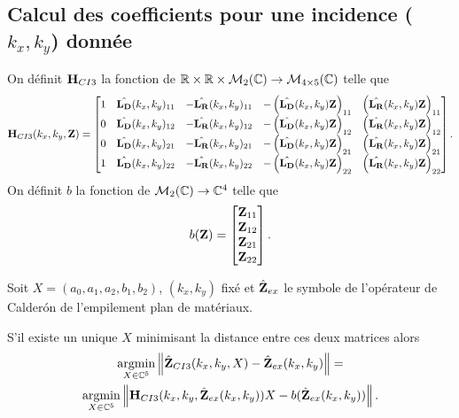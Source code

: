  \subsection{Calcul des coefficients pour une incidence (\(k_x,k_y\)) donnée}
    \begin{defn}
      On définit \(\mathbf{H}_{CI3}\) la fonction de \(\mathbb R \times \mathbb R \times \mathcal{M}_2(\mathbb C) \rightarrow \mathcal{M}_{4\times5}(\mathbb C)\) telle que
      \begin{equation*}
        \mathbf{H}_{CI3}(k_x,k_y,\mathbf{Z}) = \begin{bmatrix}
        1 & \hat{\mathbf{L_D}}(k_x,k_y)_{11} & -\hat{\mathbf{L_R}}(k_x,k_y)_{11} & -\left(\hat{\mathbf{L_D}}(k_x,k_y)\mathbf{Z}\right)_{11} & \left(\hat{\mathbf{L_R}}(k_x,k_y)\mathbf{Z}\right)_{11}
        \\
        0 & \hat{\mathbf{L_D}}(k_x,k_y)_{12} & -\hat{\mathbf{L_R}}(k_x,k_y)_{12} & -\left(\hat{\mathbf{L_D}}(k_x,k_y)\mathbf{Z}\right)_{12} & \left(\hat{\mathbf{L_R}}(k_x,k_y)\mathbf{Z}\right)_{12}
        \\
        0 & \hat{\mathbf{L_D}}(k_x,k_y)_{21} & -\hat{\mathbf{L_R}}(k_x,k_y)_{21} & -\left(\hat{\mathbf{L_D}}(k_x,k_y)\mathbf{Z}\right)_{21} & \left(\hat{\mathbf{L_R}}(k_x,k_y)\mathbf{Z}\right)_{21}
        \\
        1 & \hat{\mathbf{L_D}}(k_x,k_y)_{22} & -\hat{\mathbf{L_R}}(k_x,k_y)_{22} & -\left(\hat{\mathbf{L_D}}(k_x,k_y)\mathbf{Z}\right)_{22} & \left(\hat{\mathbf{L_R}}(k_x,k_y)\mathbf{Z}\right)_{22}
        \end{bmatrix}.
      \end{equation*}
      On définit \(b\) la fonction de \(\mathcal{M}_2(\mathbb C) \rightarrow \mathbb C^4\) telle que
      \begin{equation*}
        b(\mathbf{Z}) = \begin{bmatrix}
        \mathbf{Z}_{11}
        \\
        \mathbf{Z}_{12}
        \\
        \mathbf{Z}_{21}
        \\
        \mathbf{Z}_{22}
        \end{bmatrix}.
      \end{equation*}
    \end{defn}

    \begin{prop}
      Soit \(X = (a_0,a_1,a_2,b_1,b_2)\), \((k_x,k_y)\) fixé et \(\hat{\mathbf{Z}}_{ex}\) le symbole de l'opérateur de Calderón de l'empilement plan de matériaux.

      S'il existe un unique \(X\) minimisant la distance entre ces deux matrices alors
      \begin{multline*}
        {\underset{X\in\mathbb C^5}{\operatorname{argmin}}} \left\lVert\hat{\mathbf{Z}}_{CI3}(k_x,k_y,X) - \hat{\mathbf{Z}}_{ex}(k_x,k_y)\right\rVert =
        \\
        {\underset{X\in\mathbb C^5}{\operatorname{argmin}}} \left\lVert\mathbf{H}_{CI3}(k_x,k_y,\hat{\mathbf{Z}}_{ex}(k_x,k_y))X - b(\hat{\mathbf{Z}}_{ex}(k_x,k_y))\right\rVert.
      \end{multline*}
    \end{prop}

